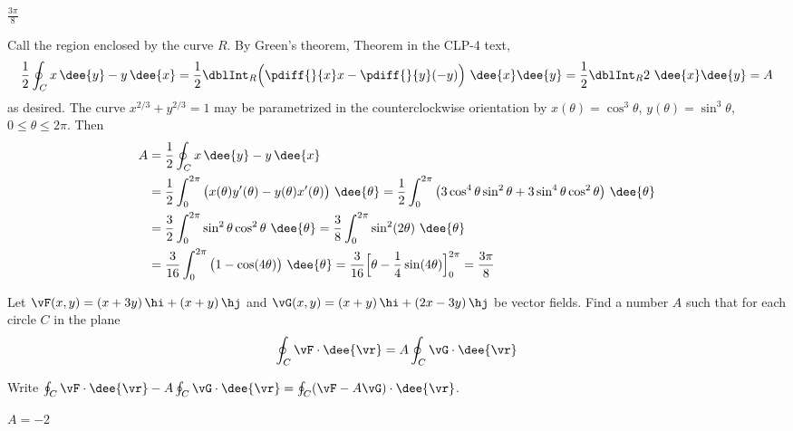 
\begin{answer}
$\frac{3\pi}{8}$
\end{answer}

\begin{solution}
Call the region enclosed by the curve $R$. By Green's theorem,
Theorem  in the CLP-4 text,
\begin{equation*}
\frac{1}{2}\oint_C x\,\dee{y}-y\,\dee{x}
=\frac{1}{2}\dblInt_R\Big(\pdiff{}{x}x
-\pdiff{}{y}(-y)\Big)\ \dee{x}\dee{y}
=\frac{1}{2}\dblInt_R 2\ \dee{x}\dee{y}
=A
\end{equation*}
as desired. The curve $x^{2/3}+y^{2/3}=1$ may be parametrized in the
counterclockwise orientation by $x(\theta)=\cos^3\theta$, $y(\theta)=\sin^3\theta$,
$0\le\theta\le 2\pi$. Then
\begin{align*}
A&=\frac{1}{2}\oint_C x\,\dee{y}-y\,\dee{x} \\
&=\frac{1}{2}\int_0^{2\pi}\big( x(\theta)y'(\theta)-y(\theta)x'(\theta)\big)\ \dee{\theta}
=\frac{1}{2}\int_0^{2\pi}\big( 3\cos^4\theta\sin^2\theta+3\sin^4\theta\cos^2\theta\big)\ \dee{\theta}\\
&=\frac{3}{2}\int_0^{2\pi}\sin^2\theta\cos^2\theta\ \dee{\theta}
=\frac{3}{8}\int_0^{2\pi}\sin^2(2\theta)\ \dee{\theta} \\
&=\frac{3}{16}\int_0^{2\pi}\big(1-\cos(4\theta)\big)\ \dee{\theta}
=\frac{3}{16}\Big[\theta-\frac{1}{4}\sin(4\theta)\Big]_0^{2\pi}
=\frac{3\pi}{8}
\end{align*}
\end{solution}

\begin{question}[M317 2001D] %
Let $\vF(x,y)=(x+3y)\,\hi+(x+y)\,\hj$ and
$\vG(x,y)=(x+y)\,\hi+(2x-3y)\,\hj$ be vector fields. Find a number $A$ such
that for each circle $C$ in the plane
$$
\oint_C\vF\cdot \dee{\vr}=A\oint_C\vG\cdot \dee{\vr}
$$
\end{question}

\begin{hint}
Write $\oint_C\vF\cdot \dee{\vr}-A\oint_C\vG\cdot \dee{\vr}
=\oint_C(\vF-A\vG)\cdot \dee{\vr}$.
\end{hint}

\begin{answer}
$A=-2$
\end{answer}

